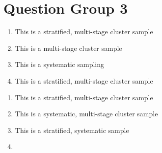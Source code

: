 \documentclass{article}
\begin{document}
\section*{Question Group 3}
\begin{enumerate}
\item This is a stratified, multi-stage cluster sample \\
\item This is a multi-stage cluster sample \\
\item This is a systematic sampling \\
\item This is a stratified, multi-stage cluster sample \\
\end{enumerate}
\begin{enumerate}
\item This is a stratified, multi-stage cluster sample \\
\item This is a systematic, multi-stage cluster sample \\
\item This is a stratified, systematic sample \\
\item 
\end{enumerate}
\end{document}

